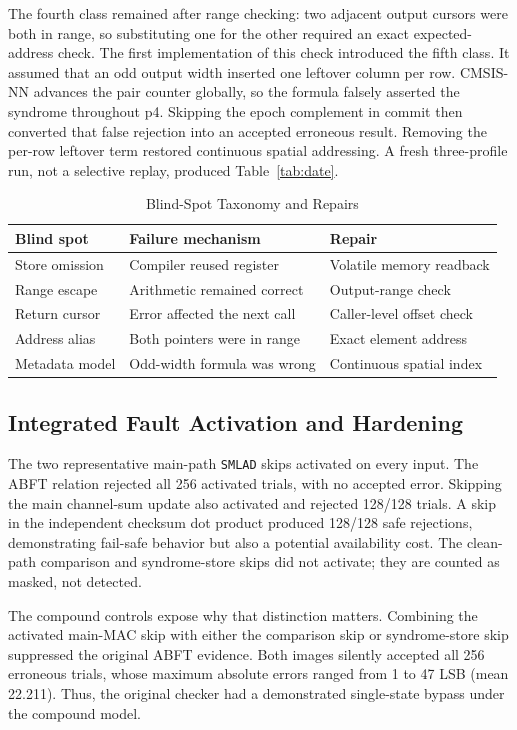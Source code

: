 \documentclass[conference]{IEEEtran}
\begin{document}
The fourth class remained after range checking: two adjacent output cursors were both in range, so substituting one for the other required an exact expected-address check. The first implementation of this check introduced the fifth class. It assumed that an odd output width inserted one leftover column per row. CMSIS-NN advances the pair counter globally, so the formula falsely asserted the syndrome throughout p4. Skipping the epoch complement in commit then converted that false rejection into an accepted erroneous result. Removing the per-row leftover term restored continuous spatial addressing. A fresh three-profile run, not a selective replay, produced Table~\ref{tab:date}.

\begin{table}[t]
\caption{Blind-Spot Taxonomy and Repairs}
\label{tab:blind}
\centering
\footnotesize
\begin{tabular}{p{}p{}p{}}
\toprule
Blind spot & Failure mechanism & Repair\\
\midrule
Store omission & Compiler reused register & Volatile memory readback\\
Range escape & Arithmetic remained correct & Output-range check\\
Return cursor & Error affected the next call & Caller-level offset check\\
Address alias & Both pointers were in range & Exact element address\\
Metadata model & Odd-width formula was wrong & Continuous spatial index\\
\bottomrule
\end{tabular}
\end{table}

\subsection{Integrated Fault Activation and Hardening}
The two representative main-path \texttt{SMLAD} skips activated on every input. The ABFT relation rejected all 256 activated trials, with no accepted error. Skipping the main channel-sum update also activated and rejected 128/128 trials. A skip in the independent checksum dot product produced 128/128 safe rejections, demonstrating fail-safe behavior but also a potential availability cost. The clean-path comparison and syndrome-store skips did not activate; they are counted as masked, not detected.

The compound controls expose why that distinction matters. Combining the activated main-MAC skip with either the comparison skip or syndrome-store skip suppressed the original ABFT evidence. Both images silently accepted all 256 erroneous trials, whose maximum absolute errors ranged from 1 to 47 LSB (mean 22.211). Thus, the original checker had a demonstrated single-state bypass under the compound model.
\end{document}

